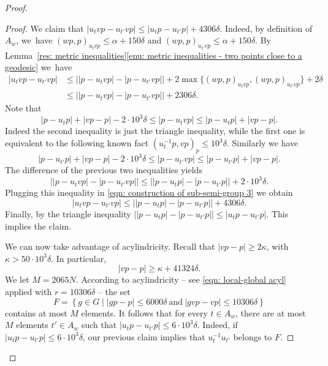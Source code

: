 \begin{proof}
\begin{proof}
We claim that $|u_tvp - u_{t'}vp| \leq |u_tp -u_{t'}p| +4306\delta$.
Indeed, by definition of $A_w$, we~have $(wp,p)_{u_tvp} \leq \alpha + 150\delta$ and $(wp,p)_{u_{t'}vp} \leq \alpha + 150\delta$.
By Lemma~\ref{res: metric inequalities}\eqref{enu: metric inequalities - two points close to a geodesic} we~have%
\begin{equation}
\label{eqn: construction of sub-semi-group 3}
\begin{split}
|u_tvp - u_{t'}vp|
& \leq \bigl||p - u_tvp| \!-\! |p-u_{t'}vp|\bigr| \!+\! 2 \max\{ (wp,p)_{u_tvp}, (wp,p)_{u_{t'}vp}\} \!+\! 2\delta \\
& \leq \bigl||p - u_tvp| \!-\! |p-u_{t'}vp|\bigr| \!+\! 2306\delta.
\end{split}
\end{equation}
Note that
\begin{equation*}
|p-u_tp| +|vp-p| - 2\cdot 10^3\delta \leq |p - u_tvp|\leq |p-u_tp| +|vp-p|.
\end{equation*}
Indeed the second inequality is just the triangle inequality, while the first one is equivalent to the following known fact $(u_t^{-1}p,vp)_p\leqslant 10^3\delta$.
Similarly we have
\begin{equation*}
|p-u_{t'}p| +|vp-p| - 2\cdot 10^3\delta \leq |p - u_{t'}vp|\leq |p-u_{t'}p| +|vp-p|.
\end{equation*}
The difference of the previous two inequalities yields
\begin{equation*}
\bigl||p - u_tvp| - |p-u_{t'}vp|\bigr| \leq \bigl| |p - u_tp| - |p - u_{t'}p|\bigr| + 2\cdot 10^3\delta.
\end{equation*}
Plugging this inequality in \eqref{eqn: construction of sub-semi-group 3} we obtain
\begin{equation*}
|u_tvp - u_{t'}vp| \leq \bigl| |p - u_tp| - |p - u_{t'}p|\bigr| + 4306 \delta.
\end{equation*}
Finally, by the triangle inequality
$
\bigl | |p - u_tp| - |p - u_{t'}p|\bigr| \leq |u_tp-u_{t'}p| .
$
This implies the claim.

We can now take advantage of acylindricity.
Recall that $|vp - p| \geq 2\kappa$, with $\kappa > 50 \cdot 10^3\delta$.
In particular,
\begin{equation*}
|vp - p| \geq \kappa + 41324\delta.
\end{equation*}
We let $M = 2065N$.
According to acylindricity -- see \eqref{eqn: local-global acyl} applied with $r = 10306\delta$ -- the set
\begin{equation*}
F = \left\{ g \in G \mid |gp - p| \leq 6000\delta\ \text{and} \ |gvp - vp| \leq 10306\delta \right\}
\end{equation*}
contains at most $M$ elements.
It follows that for every $t \in A_w$, there are at most $M$ elements $t' \in A_w$ such that $|u_tp - u_{t'}p| \leq 6\cdot 10^3\delta$.
Indeed, if $|u_tp - u_{t'}p| \leq 6\cdot 10^3\delta$, our previous claim implies that $u_t^{-1}u_{t'}$ belongs to $F$.


\end{proof}
\end{proof}
